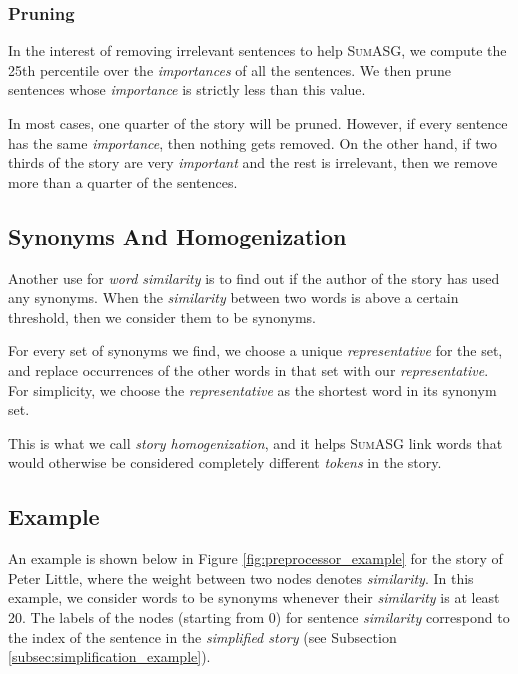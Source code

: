 \subsubsection{Pruning}

In the interest of removing irrelevant sentences to help \textsc{SumASG}, we compute the 25th percentile over the \textit{importances} of all the sentences. We then prune sentences whose \textit{importance} is strictly less than this value.

In most cases, one quarter of the story will be pruned. However, if every sentence has the same \textit{importance}, then nothing gets removed. On the other hand, if two thirds of the story are very \textit{important} and the rest is irrelevant, then we remove more than a quarter of the sentences.

\subsection{Synonyms And Homogenization}

Another use for \textit{word similarity} is to find out if the author of the story has used any synonyms. When the \textit{similarity} between two words is above a certain threshold, then we consider them to be synonyms.

For every set of synonyms we find, we choose a unique \textit{representative} for the set, and replace occurrences of the other words in that set with our \textit{representative}. For simplicity, we choose the \textit{representative} as the shortest word in its synonym set.

This is what we call \textit{story homogenization}, and it helps \textsc{SumASG} link words that would otherwise be considered completely different \textit{tokens} in the story.

\subsection{Example}

An example is shown below in Figure \ref{fig:preprocessor_example} for the story of Peter Little, where the weight between two nodes denotes \textit{similarity}. In this example, we consider words to be synonyms whenever their \textit{similarity} is at least 20. The labels of the nodes (starting from 0) for sentence \textit{similarity} correspond to the index of the sentence in the \textit{simplified story} (see Subsection \ref{subsec:simplification_example}).

